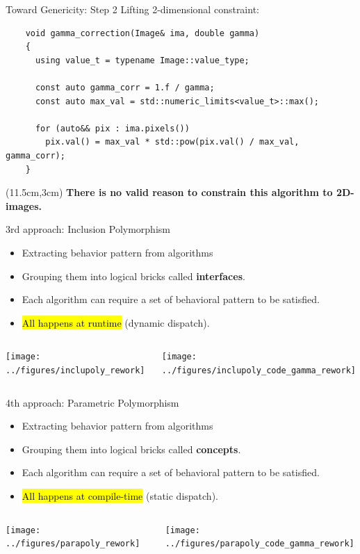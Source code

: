 \documentclass[12pt,aspectratio=169]{beamer}
\makeatletter
\let\HL\hl
\renewcommand\hl{%
  \let\set@color\beamerorig@set@color
  \let\reset@color\beamerorig@reset@color
  \HL}
\makeatother
\begin{document}
\begin{frame}[fragile]{Toward Genericity: Step 2}
  Lifting 2-dimensional constraint:
  \begin{verbatim}
    void gamma_correction(Image& ima, double gamma)
    {
      using value_t = typename Image::value_type;

      const auto gamma_corr = 1.f / gamma;
      const auto max_val = std::numeric_limits<value_t>::max();
    
      for (auto&& pix : ima.pixels())
        pix.val() = max_val * std::pow(pix.val() / max_val, gamma_corr);
    }
  \end{verbatim}
  \begin{textblock*}{4cm}(11.5cm,3cm)
    \textbf{There is no valid reason to constrain this algorithm to 2D-images.}
  \end{textblock*}
\end{frame}

\begin{frame}[fragile]{3rd approach: Inclusion Polymorphism}
  \begin{itemize}
    \item Extracting behavior pattern from algorithms
    \item Grouping them into logical bricks called \textbf{interfaces}.
    \item Each algorithm can require a set of behavioral pattern to be satisfied.
    \item \hl{All happens at runtime} (dynamic dispatch).
  \end{itemize}

  \begin{columns}[T,onlytextwidth]
    \centering
    \texttt{[image: ../figures/inclupoly\_rework]}

    \centering
    \texttt{[image: ../figures/inclupoly\_code\_gamma\_rework]}
  \end{columns}
\end{frame}

\begin{frame}[fragile]{4th approach: Parametric Polymorphism}
  \begin{itemize}
    \item Extracting behavior pattern from algorithms
    \item Grouping them into logical bricks called \textbf{concepts}.
    \item Each algorithm can require a set of behavioral pattern to be satisfied.
    \item \hl{All happens at compile-time} (static dispatch).
  \end{itemize}

  \begin{columns}[T,onlytextwidth]
    \centering
    \texttt{[image: ../figures/parapoly\_rework]}

    \centering
    \texttt{[image: ../figures/parapoly\_code\_gamma\_rework]}
  \end{columns}
\end{frame}
\end{document}
